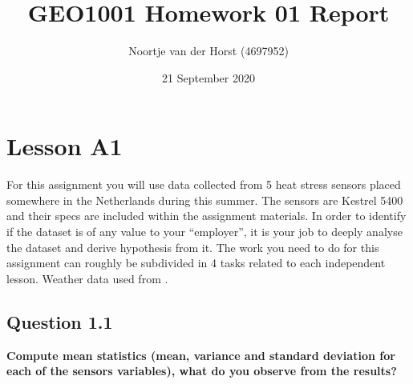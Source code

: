 \documentclass{report}
\title{GEO1001 Homework 01 Report}
\author{Noortje van der Horst (4697952)}
\date{21 September 2020}
\begin{document}
	
	\maketitle
	
	\section{Lesson A1}
	For this assignment you will use data collected from 5 heat stress sensors placed somewhere in the Netherlands during this summer. The sensors are Kestrel 5400 and their specs are included within the assignment materials. In order to identify if the dataset is of any value to your “employer”, it is your job to deeply analyse the dataset and derive hypothesis from it. The work you need to do for this assignment can roughly be subdivided in 4 tasks related to each independent lesson. Weather data used from \cite{Maiullari2020}.
	
	
	\subsection{Question 1.1}
	\textbf{Compute mean statistics (mean, variance and standard deviation for each of the sensors variables), what do you observe from the results?}
	
\end{document}

